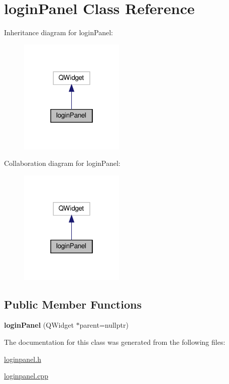 \hypertarget{classloginPanel}{}\section{login\+Panel Class Reference}
\label{classloginPanel}


Inheritance diagram for login\+Panel\+:\nopagebreak
\begin{figure}[H]
\begin{center}
\leavevmode
\includegraphics[width=142pt]{classloginPanel__inherit__graph}
\end{center}
\end{figure}


Collaboration diagram for login\+Panel\+:\nopagebreak
\begin{figure}[H]
\begin{center}
\leavevmode
\includegraphics[width=142pt]{classloginPanel__coll__graph}
\end{center}
\end{figure}
\subsection*{Public Member Functions}
\begin{DoxyCompactItemize}
\item 
\mbox{\label{classloginPanel_a22f12ed558377b1de1738117419c6e6e}} 
{\bfseries login\+Panel} (Q\+Widget $\ast$parent=nullptr)
\end{DoxyCompactItemize}


The documentation for this class was generated from the following files\+:\begin{DoxyCompactItemize}
\item 
\hyperlink{loginpanel_8h}{loginpanel.\+h}\item 
\hyperlink{loginpanel_8cpp}{loginpanel.\+cpp}\end{DoxyCompactItemize}
